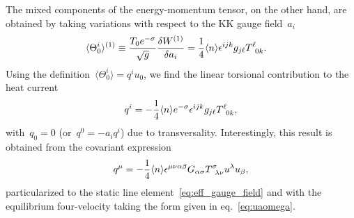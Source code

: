 \documentclass[11pt,a4paper]{article}
\begin{document}
The mixed components of the energy-momentum tensor, on the other hand, are obtained by taking variations
with respect to the KK gauge field~$a_{i}$ 
\begin{align}
\langle\Theta^{i}_{0}\rangle^{(1)}
&\equiv{T_{0}e^{-\sigma}\over \sqrt{g}}{\delta W^{(1)}\over \delta a_{i}}
={1\over 4}\langle n\rangle\epsilon^{ijk}g_{j\ell}T^{\ell}_{\,\,\,0k}.
\label{eq:Thetaupidown0generalf}
\end{align}
Using the definition~$\langle\Theta^{i}_{0}\rangle=q^{i}u_{0}$, we find the linear 
torsional contribution to the heat current
\begin{align}
q^{i}=-{1\over 4}\langle n\rangle e^{-\sigma}\epsilon^{ijk}g_{j\ell}T^{\ell}_{\,\,\,0k},
\label{eq:heat_current_general_noncov}
\end{align}
with~$q_{0}=0$ (or~$q^{0}=-a_{i}q^{i}$) due to transversality.
Interestingly, this result is obtained from the covariant expression
\begin{align}
q^{\mu}=-{1\over 4}\langle n\rangle \epsilon^{\mu\nu\alpha\beta}G_{\alpha\sigma}
T^{\sigma}_{\,\,\,\lambda\nu}u^{\lambda}u_{\beta},
\label{eq:qmu}
\end{align}
particularized
to the static line element~\eqref{eq:eff_gauge_field} and with the 
equilibrium four-velocity taking the form given in eq.~\eqref{eq:uaomega}. 
\end{document}
